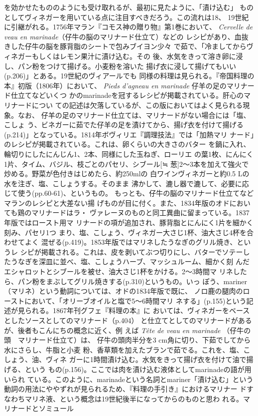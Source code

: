 {{{{  を効かせたもののようにも受け取れるが、最初に見たように、「漬け込む」
  ものとしてヴィネガーを用いている点に注目すべきだろう。この流れは18、
  19世紀に引継がれる。1756年マラン『コモス神の贈り物』第1巻において、
  \emph{Cervelle de veau en
  marinade}（仔牛の脳のマリナード仕立て）などの
  レシピがあり、血抜きした仔牛の脳を豚背脂のシートで包みブイヨン少々
  で茹で、「冷ましてからヴィネガーもしくはレモン果汁に漬け込む。その
  後、水気をきって溶き卵に浸し、パン粉をつけて揚げる。小麦粉を溶いた
  揚げ衣に浸して揚げてもいい(p.206)」とある。19世紀のヴィアールでも
  同様の料理は見られる。『帝国料理の本』初版（1806年）において、
  \emph{Pieds d'agneau en marinade} 仔羊の足のマリナード仕立てなどいくつ
  かのmarinadeを冠するレシピが掲載されている。肝心のマリナードについ
  ての記述は欠落しているが、この版においてはよく見られる現象。なお、
  仔羊の足のマリナード仕立ては、マリナードがない場合には「塩、こしょ
  う、ビネガーに茹でた仔羊の足を漬けてから、揚げ衣を付けて揚げる
  (p.214)」となっている。1814年ボヴィリエ『調理技法』では「加熱マリ
  ナード」のレシピが掲載されている。これは、卵くらいの大きさのバター
  を鍋に入れ、輪切りにしたにんじん1、2本、同様にした玉ねぎ、ローリエ
  の葉1枚、にんにく1片、タイム、バジル、枝ごとのパセリ、シブール{[}≒
  葱{]}2〜3本を加えて強火で炒める。野菜が色付きはじめたら、約250mlの
  白ワインヴィネガーと約0.5 Lの水を注ぎ、塩、こしょうする。そのまま
  沸かして、漉し器で漉して、必要に応じて使う(pp.60-61)、というもの。
  もっとも、仔牛の脳のマリナード仕立てなどマランのレシピと大差ない揚
  げものが目に付く。また、1834年版のオドにおいても鶏のマリナードはラ・
  ヴァレーヌのものと同工異曲に留まっている。1837年版ではロースト用マ
  リナードの項が追加され、豚背脂とにんにく1片を細かく刻み、パセリ1つ
  まり、塩、こしょう、ヴィネガー大さじ1杯、油大さじ4杯を合わせてよく
  混ぜる(p.419)。1853年版ではマリネしたうなぎのグリル焼き、というレ
  シピが掲載される。これは、皮を剥いてぶつ切りにし、バターでソテーし
  たうなぎを深皿に並べ、塩、こしょうハーブ、マッシュルーム、細かく刻
  んだエシャロットとシブールを被せ、油大さじ1杯をかける。2〜3時間マ
  リネしたら、パン粉をまぶしてグリル焼きする(p.310)というもの。いっ
  ぽう、mariner（マリネ）という動詞については、オドの1834年版で既に、
  ノロ鹿の腿肉のローストにおいて、「オリーブオイルと塩で5〜6時間マリ
  ネする」(p.155)という記述が見られる。1867年刊グフェ『料理の本』に
  おいては、ヴィネガーをベースとしたソースとしてのマリナード（p.404）
  と仕立てとしてのマリナードがあるが、後者もこんにちの概念に近く、例
  えば \emph{Tête de veau en marinade}
  （仔牛の頭　マリナード仕立て）は、 仔牛の頭肉半分を3
  cm角に切り、下茹でしてから水にさらし、牛脂と小麦
  粉、香草類を加えたブランで茹でる。これを、塩、こしょう、油、ヴィネ
  ガーに1時間漬け込む。水気をきって揚げ衣を付けて油で揚げる、という
  もの(p.156)。ここでは肉を漬け込む液体としてmarinadeの語が用いられ
  ている。このように、marinadeという名詞とmariner「漬け込む」という
  動詞の用法にややずれが見られるため、『料理の手引き』におけるマリナー
  ドすなわちマリネ液、という概念は19世紀後半になってからのものと思わ
  れる。}}{マリナードとソミュール}}\label{ux30deux30eaux30caux30fcux30c9ux3068ux30bdux30dfux30e5ux30fcux30eb1}}

